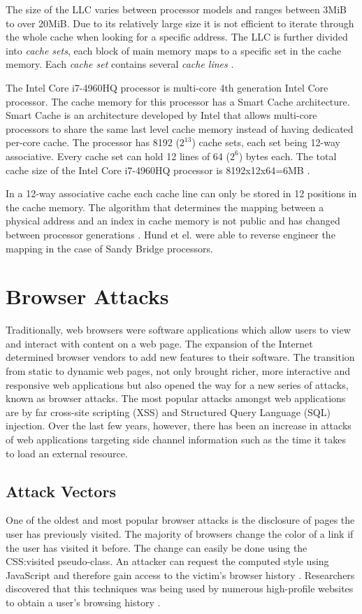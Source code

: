 \documentclass[10pt,a4paper,twoside]{book}
\begin{document}
The size of the LLC varies between processor models and ranges between 3MiB to over 20MiB. Due to its relatively large size it is not efficient to iterate through the whole cache when looking for a specific address. The LLC is further divided into \textit{cache sets}, each block of main memory maps to a specific set in the cache memory. Each \textit{cache set} contains several \textit{cache lines} \cite{oren2015spy}. 

The Intel Core i7-4960HQ processor is multi-core 4th generation Intel Core processor. The cache memory for this processor has a Smart Cache architecture. Smart Cache is an architecture developed by Intel that allows multi-core processors to share the same last level cache memory instead of having dedicated per-core cache. The processor has 8192 ($2^{13}$) cache sets, each set being 12-way associative. Every cache set can hold 12 lines of  64 ($2^6$) bytes each. The total cache size of the Intel Core i7-4960HQ processor is 8192x12x64=6MB \cite{oren2015spy}.

In a 12-way associative cache each cache line can only be stored in 12 positions in the cache memory. The algorithm that determines the mapping between a physical address and an index in cache memory is not public and has changed between processor generations \cite{oren2015spy}. Hund et el. \cite{hund2013practical} were able to reverse engineer the mapping in the case of Sandy Bridge processors.

\section{Browser Attacks}
\label{tb:browserattacks}
Traditionally, web browsers were software applications which allow users to view and interact with content on a web page. The expansion of the Internet determined browser vendors to add new features to their software. The transition from static to dynamic web pages, not only brought richer, more interactive and responsive web applications but also opened the way for a new series of attacks, known as browser attacks. The most popular attacks amongst web applications are by far cross-site scripting (XSS) and Structured Query Language (SQL) injection. Over the last few years, however, there has been an increase in attacks of web applications targeting side channel information such as the time it takes to load an external resource.

\subsection{Attack Vectors}
One of the oldest and most popular browser attacks is the disclosure of pages the user has previously visited. The majority of browsers change the color of a link if the user has visited it before. The change can easily be done using the CSS:visited pseudo-class. An attacker can request the computed style using JavaScript and therefore gain access to the victim's browser history \cite{cssvisited}. Researchers discovered that this techniques was being used by numerous high-profile websites to obtain a user's browsing history
\cite{jang2010empirical}.
\end{document}
